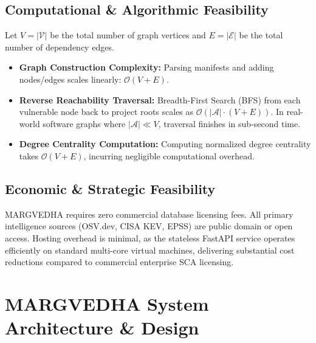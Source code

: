 \documentclass[12pt,a4paper,oneside]{report}
\begin{document}
\section{Computational \& Algorithmic Feasibility}
Let $V = |\mathcal{V}|$ be the total number of graph vertices and $E = |\mathcal{E}|$ be the total number of dependency edges.
\begin{itemize}
    \item \textbf{Graph Construction Complexity:} Parsing manifests and adding nodes/edges scales linearly: $\mathcal{O}(V + E)$.
    \item \textbf{Reverse Reachability Traversal:} Breadth-First Search (BFS) from each vulnerable node back to project roots scales as $\mathcal{O}(|\mathcal{A}| \cdot (V + E))$. In real-world software graphs where $|\mathcal{A}| \ll V$, traversal finishes in sub-second time.
    \item \textbf{Degree Centrality Computation:} Computing normalized degree centrality takes $\mathcal{O}(V + E)$, incurring negligible computational overhead.
\end{itemize}

\section{Economic \& Strategic Feasibility}
MARGVEDHA requires zero commercial database licensing fees. All primary intelligence sources (OSV.dev, CISA KEV, EPSS) are public domain or open access. Hosting overhead is minimal, as the stateless FastAPI service operates efficiently on standard multi-core virtual machines, delivering substantial cost reductions compared to commercial enterprise SCA licensing.

\chapter{MARGVEDHA System Architecture \& Design}
\end{document}

